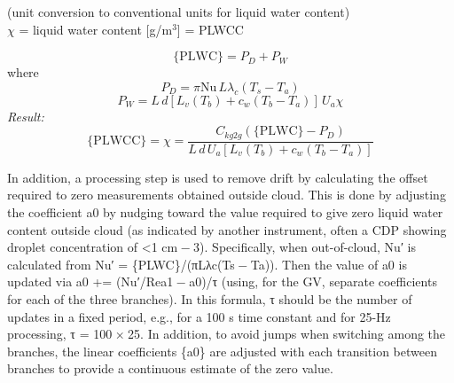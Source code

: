 \documentclass[
  english,
]{book}
\begin{document}
\hspace*{0.333em}\hspace*{0.333em}\hspace*{0.333em}\hspace*{0.333em}\hspace*{0.333em}\hspace*{0.333em}\hspace*{0.333em}\hspace*{0.333em}\hspace*{0.333em}\hspace*{0.333em}(unit conversion to conventional units for liquid water content)\\
\(\chi\) = liquid water
content {[}g/m\(^{3}\){]} = PLWCC

\begin{equation}
\mathrm{\{PLWC\}} = P_{D}+P_{W}
\label{eq:PLWCa}
\end{equation}
where\\
\begin{equation}
P_{D}=\pi\mathrm{Nu}\,L\lambda_{c}(T_{s}-T_{a})
\label{eq:PLWCb}
\end{equation}
\begin{equation}
P_{W}=L\,d[L_{v}(T_{b})+c_{w}(T_{b}-T_{a})]\,U_{a}\chi
\label{eq:PLWCc}
\end{equation}
\emph{Result:}\\
\begin{equation}
\mathrm{\{PLWCC\}}=\chi=\frac{C_{kg2g}(\mathrm{\{PLWC\}}-P_{D})}{L\,d\,U_{a}[L_{v}(T_{b})+c_{w}(T_{b}-T_{a})]}
\label{eq:PLWCd}
\end{equation}

In addition, a processing step is used to remove drift by calculating the offset required to zero measurements obtained outside cloud. This is done by adjusting the coefficient {a0} by nudging toward the value required to give zero liquid water content outside cloud (as indicated by another instrument, often a CDP showing droplet concentration of \textless1 cm{ − 3}). Specifically, when out-of-cloud, Nu{′} is calculated from Nu{′ = \{PLWC\}/(πLλc(Ts − Ta))}. Then the value of {a0} is updated via {a0} += (Nu{′/Rea1 − a0)/τ} (using, for the GV, separate coefficients for each of the three branches). In this formula, {τ} should be the number of updates in a fixed period, e.g., for a 100 s time constant and for 25-Hz processing, {τ = 100 × 25}. In addition, to avoid jumps when switching among the branches, the linear coefficients \{{a0}\} are adjusted with each transition between branches to provide a continuous estimate of the zero value.
\end{document}
